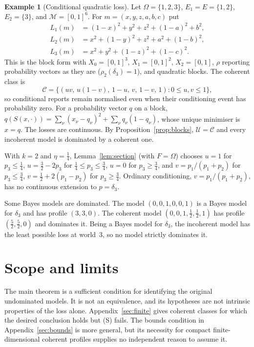 \documentclass[11pt]{article}
\theoremstyle{definition}
\newtheorem{example}[theorem]{Example}
\theoremstyle{remark}
\newcommand{\M}{\mathcal M}
\newcommand{\C}{\mathcal C}
\newcommand{\U}{\mathcal U}
\begin{document}
\begin{example}[Conditional quadratic loss]\label{ex:conditional}
Let $\Omega=\{1,2,3\}$, $E_1=E=\{1,2\}$, $E_2=\{3\}$, and $\M=[0,1]^6$. For $m=(x,y,z,a,b,c)$ put
\[
\begin{aligned}
 L_1(m)&=(1-x)^2+y^2+z^2+(1-a)^2+b^2,\\
 L_2(m)&=x^2+(1-y)^2+z^2+a^2+(1-b)^2,\\
 L_3(m)&=x^2+y^2+(1-z)^2+(1-c)^2.
\end{aligned}
\]
This is the block form with $X_0=[0,1]^3$, $X_1=[0,1]^2$, $X_2=[0,1]$, $\rho$ reporting probability vectors as they are ($\rho_2(\delta_3)=1$), and quadratic blocks. The coherent class is
\[
 \C=\{(uv,\,u(1-v),\,1-u,\,v,\,1-v,\,1):0\le u,v\le1\},
\]
so conditional reports remain normalised even when their conditioning event has probability zero. For a probability vector $q$ on a block, $q(S(x,\cdot))=\sum_\nu(x_\nu-q_\nu)^2+\sum_\nu q_\nu(1-q_\nu)$, whose unique minimiser is $x=q$. The losses are continuous. By Proposition~\ref{prop:blocks}, $\U=\C$ and every incoherent model is dominated by a coherent one.

With $k=2$ and $\eta=\tfrac14$, Lemma~\ref{lem:section} (with $F=\Omega$) chooses $u=1$ for $p_3\le\tfrac14$, $u=\tfrac32-2p_3$ for $\tfrac14\le p_3\le\tfrac34$, $u=0$ for $p_3\ge\tfrac34$, and $v=p_1/(p_1+p_2)$ for $p_3\le\tfrac34$, $v=\tfrac12+2(p_1-p_2)$ for $p_3\ge\tfrac34$. Ordinary conditioning, $v=p_1/(p_1+p_2)$, has no continuous extension to $p=\delta_3$.

Some Bayes models are dominated. The model $(0,0,1,0,0,1)$ is a Bayes model for $\delta_3$ and has profile $(3,3,0)$. The coherent model $(0,0,1,\tfrac12,\tfrac12,1)$ has profile $(\tfrac52,\tfrac52,0)$ and dominates it. Being a Bayes model for $\delta_3$, the incoherent model has the least possible loss at world~$3$, so no model strictly dominates it.
\end{example}




\section{Scope and limits}\label{sec:scope}
The main theorem is a sufficient condition for identifying the original undominated models. It is not an equivalence, and its hypotheses are not intrinsic properties of the loss alone. Appendix~\ref{sec:finite} gives coherent classes for which the desired conclusion holds but (S) fails. The bounds condition in Appendix~\ref{sec:bounds} is more general, but its necessity for compact finite-dimensional coherent profiles supplies no independent reason to assume it.
\end{document}
